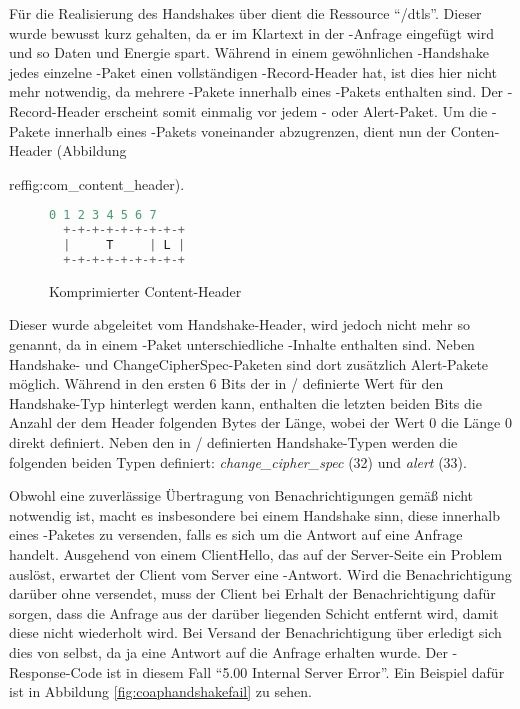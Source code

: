 Für die Realisierung des Handshakes über  dient die Ressource "`/dtls"'. Dieser  wurde bewusst kurz gehalten,
da er im Klartext in der -Anfrage eingefügt wird und so Daten und Energie spart. Während in einem gewöhnlichen -Handshake
jedes einzelne -Paket einen vollständigen -Record-Header hat, ist dies hier nicht mehr notwendig, da mehrere
-Pakete innerhalb eines -Pakets enthalten sind. Der -Record-Header erscheint somit einmalig vor jedem
- oder Alert-Paket. Um die -Pakete innerhalb eines -Pakets voneinander abzugrenzen, dient nun der
Conten-Header (Abbildung {ref{fig:com\_content\_header}).

\begin{figure}[ht]
  \centering
  \begin{lstlisting}[language=c]
   0 1 2 3 4 5 6 7
  +-+-+-+-+-+-+-+-+
  |     T     | L |
  +-+-+-+-+-+-+-+-+
  \end{lstlisting}
  \caption{Komprimierter Content-Header}
  \label{fig:com_content_header}
\end{figure}

Dieser wurde abgeleitet vom Handshake-Header, wird jedoch nicht mehr so genannt, da in einem -Paket unterschiedliche -Inhalte
enthalten sind. Neben Handshake- und ChangeCipherSpec-Paketen sind dort zusätzlich Alert-Pakete möglich. Während in den ersten 6 Bits der in
/ definierte Wert für den Handshake-Typ hinterlegt werden kann, enthalten die letzten beiden Bits die Anzahl der dem Header folgenden
Bytes der Länge, wobei der Wert 0 die Länge 0 direkt definiert. Neben den in / definierten Handshake-Typen werden die folgenden
beiden Typen definiert: \textit{change\_cipher\_spec} (32) und \textit{alert} (33).

Obwohl eine zuverlässige Übertragung von Benachrichtigungen gemäß  nicht notwendig ist, macht es insbesondere bei einem Handshake sinn, diese
innerhalb eines -Paketes zu versenden, falls es sich um die Antwort auf eine Anfrage handelt. Ausgehend von einem ClientHello, das
auf der Server-Seite ein Problem auslöst, erwartet der Client vom Server eine -Antwort. Wird die Benachrichtigung darüber ohne  versendet,
muss der Client bei Erhalt der Benachrichtigung dafür sorgen, dass die Anfrage aus der darüber liegenden  Schicht entfernt wird, damit diese
nicht wiederholt wird. Bei Versand der Benachrichtigung über  erledigt sich dies von selbst, da ja eine Antwort auf die Anfrage erhalten wurde.
Der -Response-Code ist in diesem Fall "`5.00 Internal Server Error"'. Ein Beispiel dafür ist in Abbildung \ref{fig:coaphandshakefail} zu sehen.

}
